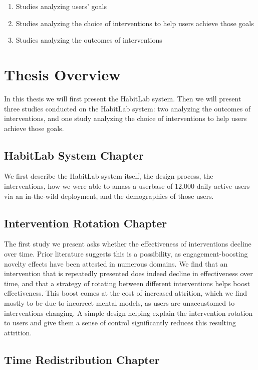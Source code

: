 \begin{enumerate}
\item Studies analyzing users' goals
\item Studies analyzing the choice of interventions to help users achieve those goals
\item Studies analyzing the outcomes of interventions
\end{enumerate}

\section{Thesis Overview}

In this thesis we will first present the HabitLab system. Then we will present three studies conducted on the HabitLab system: two analyzing the outcomes of interventions, and one study analyzing the choice of interventions to help users achieve those goals.

\subsection{HabitLab System Chapter}

We first describe the HabitLab system itself, the design process, the interventions, how we were able to amass a userbase of 12,000 daily active users via an in-the-wild deployment, and the demographics of those users.

\subsection{Intervention Rotation Chapter}

The first study we present asks whether the effectiveness of interventions decline over time. Prior literature suggests this is a possibility, as engagement-boosting novelty effects have been attested in numerous domains. We find that an intervention that is repeatedly presented does indeed decline in effectiveness over time, and that a strategy of rotating between different interventions helps boost effectiveness. This boost comes at the cost of increased attrition, which we find mostly to be due to incorrect mental models, as users are unaccustomed to interventions changing. A simple design helping explain the intervention rotation to users and give them a sense of control significantly reduces this resulting attrition.

\subsection{Time Redistribution Chapter}

